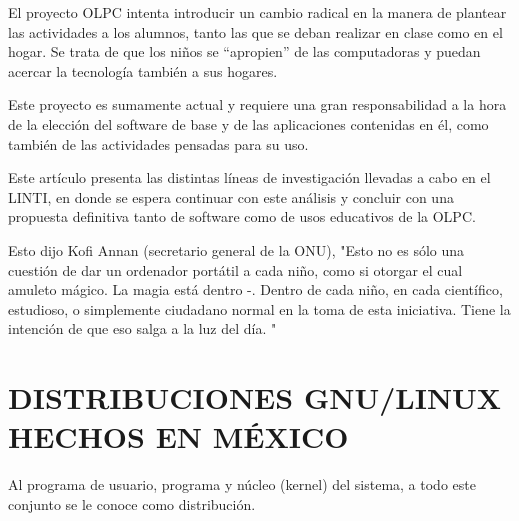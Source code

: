 El proyecto OLPC intenta introducir un cambio radical en la
manera de plantear las actividades a los alumnos, tanto las que
se deban realizar en clase como en el hogar. Se trata de que los
niños se “apropien” de las computadoras y puedan acercar la
tecnología también a sus hogares.

Este proyecto es sumamente actual y requiere una gran
responsabilidad a la hora de la elección del software de base y
de las aplicaciones contenidas en él, como también de las
actividades pensadas para su uso.

Este artículo presenta las distintas líneas de investigación
llevadas a cabo en el LINTI, en donde se espera continuar con
este análisis y concluir con una propuesta definitiva tanto de
software como de usos educativos de la OLPC.

Esto dijo Kofi Annan (secretario general de la ONU), "Esto no es
sólo una cuestión de dar un ordenador portátil a cada niño,
como si otorgar el cual amuleto mágico. La magia está dentro -.
Dentro de cada niño, en cada científico, estudioso, o
simplemente ciudadano normal en la toma de esta iniciativa.
Tiene la intención de que eso salga a la luz del día. "
   
\section*{DISTRIBUCIONES GNU/LINUX HECHOS EN MÉXICO}
Al programa de usuario, programa y núcleo (kernel) del sistema,
a todo este conjunto se le conoce como distribución.
